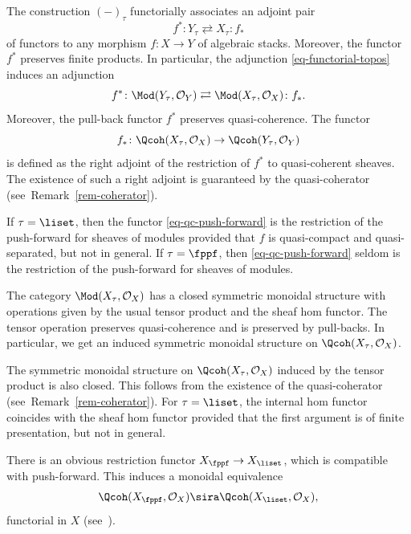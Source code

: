 The construction $(-)_\tau$ functorially associates an adjoint pair 
\begin{equation}
\label{eq-functorial-topos}
f^*\colon Y_\tau \rightleftarrows X_\tau \colon f_*
\end{equation}
of functors to any morphism $f\colon X \to Y$ of algebraic stacks.
Moreover, the functor $f^*$ preserves finite products.
In particular, the adjunction \eqref{eq-functorial-topos} induces an adjunction
\begin{equation}
\label{eq-functorial-module}
f^*\colon \Mod(Y_\tau, \mathcal{O}_Y) \rightleftarrows \Mod(X_\tau, \mathcal{O}_X) \colon f_*.
\end{equation}
Moreover, the pull-back functor $f^*$ preserves quasi-coherence.
The functor
\begin{equation}
\label{eq-qc-push-forward}
f_*\colon \Qcoh(X_\tau, \mathcal{O}_X) \to \Qcoh(Y_\tau, \mathcal{O}_Y)
\end{equation}
is defined as the right adjoint of the restriction of $f^*$ to
quasi-coherent sheaves.
The existence of such a right adjoint is guaranteed by the quasi-coherator
(see~Remark~\ref{rem-coherator}).
\begin{remark}
\label{rem-qc-pf}
If $\tau = \liset$, then the functor \eqref{eq-qc-push-forward} is the restriction of the push-forward for sheaves of modules
provided that $f$ is quasi-compact and quasi-separated,
but not in general.
If $\tau = \fppf$, then \eqref{eq-qc-push-forward} seldom is the restriction of the push-forward for sheaves of modules.
\end{remark}
The category $\Mod(X_\tau, \mathcal{O}_X)$ has a closed symmetric monoidal
structure with operations given by the usual tensor product  and the sheaf hom functor.
The tensor operation preserves quasi-coherence and is preserved by pull-backs.
In particular, we get an induced symmetric monoidal structure on $\Qcoh(X_\tau, \mathcal{O}_X)$.

\begin{remark}
\label{rem-qc-hom}
The symmetric monoidal structure on $\Qcoh(X_\tau, \mathcal{O}_X)$ induced by the tensor product
is also closed.
This follows from the existence of the quasi-coherator (see~Remark~\ref{rem-coherator}).
For $\tau = \liset$,
the internal hom functor coincides with the sheaf hom functor provided that the first argument is of finite presentation, but not in general.
\end{remark}

There is an obvious restriction functor $X_\fppf \to X_\liset$,
which is compatible with push-forward.
This induces a monoidal equivalence
\begin{equation}
\label{eq-change-site}
\Qcoh(X_\fppf, \mathcal{O}_X) \sira \Qcoh(X_\liset, \mathcal{O}_X),
\end{equation}
functorial in $X$ (see~\cite[]{stacks-project}).

